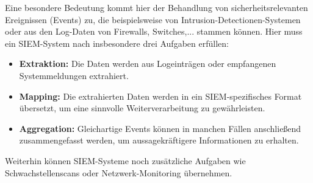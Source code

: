 Eine besondere Bedeutung kommt hier der Behandlung von sicherheitsrelevanten Ereignissen (Events) zu, die beispielsweise von Intrusion-Detectionen-Systemen oder aus den Log-Daten von Firewalls, Switches,... stammen können. Hier muss ein SIEM-System nach \cite{detken2014} insbesondere drei Aufgaben erfüllen:
\begin{itemize}
	\item \textbf{Extraktion:} Die Daten werden aus Logeinträgen oder empfangenen Systemmeldungen extrahiert. 
	\item \textbf{Mapping:} Die extrahierten Daten werden in ein SIEM-spezifisches Format übersetzt, um eine sinnvolle Weiterverarbeitung zu gewährleisten.
	\item \textbf{Aggregation:} Gleichartige Events können in manchen Fällen anschließend zusammengefasst werden, um aussagekräftigere Informationen zu erhalten.
\end{itemize}

Weiterhin können SIEM-Systeme noch zusätzliche Aufgaben wie Schwachstellenscans oder Netzwerk-Monitoring übernehmen.

